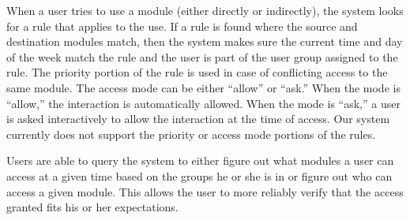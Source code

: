 When a user tries to use a module (either directly or indirectly), the system
looks for a rule that applies to the use. If a rule is found where the source
and destination modules match, then the system makes sure the current time and
day of the week match the rule and the user is part of the user group assigned
to the rule. The priority portion of the rule is used in case of conflicting
access to the same module. The access mode can be either ``allow'' or ``ask.''
When the mode is ``allow,'' the interaction is automatically allowed. When the
mode is ``ask,'' a user is asked interactively to allow the interaction at the
time of access. Our system currently does not support the priority or access
mode portions of the rules.

Users are able to query the system to either figure out what modules a user can
access at a given time based on the groups he or she is in or figure out who can
access a given module. This allows the user to more reliably verify that the
access granted fits his or her expectations.
